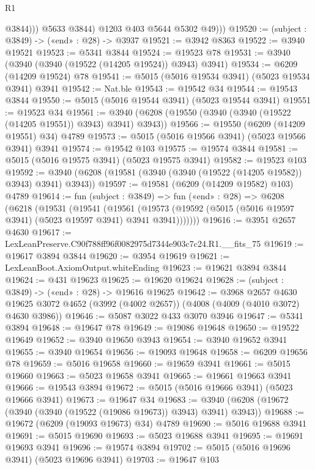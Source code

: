 \begin{lexlean}{R1}
\begin{coremodule}
                  @3844)))
            @5633
            @3844)
          @1203
          @403
          @5644
          @5302
          @49)))
@19520 := (subject : @3849) -> («end» : @28) -> @3937
@19521 := @3942 @8363
@19522 := @3940 @19521
@19523 := @5341 @3844
@19524 := @19523 @78
@19531 := @3940 (@3940 (@3940 (@19522 (@14205 @19524)) @3943) @3941)
@19534 := @6209 (@14209 @19524) @78
@19541 := @5015 (@5016 @19534 @3941) (@5023 @19534 @3941) @3941
@19542 := Nat.ble
@19543 := @19542 @34
@19544 := @19543 @3844
@19550 := @5015 (@5016 @19544 @3941) (@5023 @19544 @3941)
@19551 := @19523 @34
@19561 := @3940 (@6208 (@19550 (@3940 (@3940 (@19522 (@14205 @19551)) @3943) @3941) @3943))
@19566 := @19550 (@6209 (@14209 @19551) @34) @4789
@19573 := @5015 (@5016 @19566 @3941) (@5023 @19566 @3941) @3941
@19574 := @19542 @103
@19575 := @19574 @3844
@19581 := @5015 (@5016 @19575 @3941) (@5023 @19575 @3941)
@19582 := @19523 @103
@19592 := @3940 (@6208 (@19581 (@3940 (@3940 (@19522 (@14205 @19582)) @3943) @3941) @3943))
@19597 := @19581 (@6209 (@14209 @19582) @103) @4789
@19614 := fun (subject : @3849) =>
  fun («end» : @28) =>
  @6208
    (@6218
      (@19531
        (@19541
          (@19561
            (@19573 (@19592 (@5015 (@5016 @19597 @3941) (@5023 @19597 @3941) @3941 @3941)))))))
@19616 := @3951 @2657 @4630
@19617 := LexLeanPreserve.C90f788ff96f0082975d7344e903c7c24.R1.__fits_75
@19619 := @19617 @3894 @3844
@19620 := @3954 @19619
@19621 := LexLeanBoot.AxiomOutput.whiteEnding
@19623 := @19621 @3894 @3844
@19624 := @431 @19623
@19625 := @19620 @19624
@19628 := (subject : @3849) -> («end» : @28) -> @19616 @19625
@19642 := @3968
    @2657
    @4630
    @19625
    @3072
    @4652
    (@3992 (@4002 @2657))
    (@4008 (@4009 (@4010 @3072) @4630 @3986))
@19646 := @5087 @3022 @433 @3070 @3946
@19647 := @5341 @3894
@19648 := @19647 @78
@19649 := @19086 @19648
@19650 := @19522 @19649
@19652 := @3940 @19650 @3943
@19654 := @3940 @19652 @3941
@19655 := @3940 @19654
@19656 := @19093 @19648
@19658 := @6209 @19656 @78
@19659 := @5016 @19658
@19660 := @19659 @3941
@19661 := @5015 @19660
@19663 := @5023 @19658 @3941
@19665 := @19661 @19663 @3941
@19666 := @19543 @3894
@19672 := @5015 (@5016 @19666 @3941) (@5023 @19666 @3941)
@19673 := @19647 @34
@19683 := @3940 (@6208 (@19672 (@3940 (@3940 (@19522 (@19086 @19673)) @3943) @3941) @3943))
@19688 := @19672 (@6209 (@19093 @19673) @34) @4789
@19690 := @5016 @19688 @3941
@19691 := @5015 @19690
@19693 := @5023 @19688 @3941
@19695 := @19691 @19693 @3941
@19696 := @19574 @3894
@19702 := @5015 (@5016 @19696 @3941) (@5023 @19696 @3941)
@19703 := @19647 @103

\end{coremodule}
\end{lexlean}

